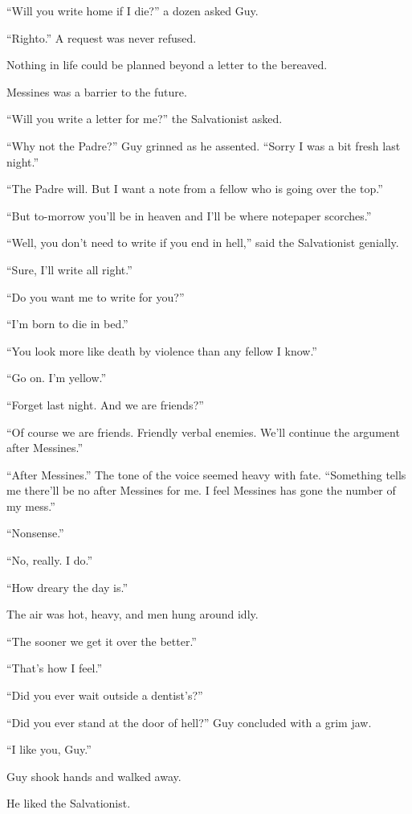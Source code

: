 ``Will you write home if I die?'' a dozen asked Guy.

``Righto.'' A request was never refused.

Nothing in life could be planned beyond a letter to the bereaved.

Messines was a barrier to the future.

``Will you write a letter for me?'' the Salvationist asked.

``Why not the Padre?'' Guy grinned as he assented. ``Sorry I was a bit fresh last night.''

``The Padre will. But I want a note from a fellow who is going over the top.''

``But to-morrow you'll be in heaven and I'll be where notepaper scorches.''

``Well, you don't need to write if you end in hell,'' said the Salvationist genially.

``Sure, I'll write all right.''

``Do you want me to write for you?''

``I'm born to die in bed.''

``You look more like death by violence than any fellow I know.''

``Go on. I'm yellow.''

``Forget last night. And we are friends?''

``Of course we are friends. Friendly verbal enemies. We'll continue the argument after Messines.''

``After Messines.'' The tone of the voice seemed heavy with fate. ``Something tells me there'll be no after Messines for me. I feel Messines has gone the number of my mess.''

``Nonsense.''

``No, really. I do.''

``How dreary the day is.''

The air was hot, heavy, and men hung around idly.

``The sooner we get it over the better.''

``That's how I feel.''

``Did you ever wait outside a dentist's?''

``Did you ever stand at the door of hell?'' Guy concluded with a grim jaw.

``I like you, Guy.''

Guy shook hands and walked away.

He liked the Salvationist.
